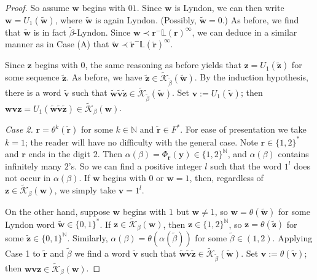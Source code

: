 \documentclass[11pt]{amsart}
\theoremstyle{definition}
\theoremstyle{remark}
\numberwithin{equation}{section}
\newcommand{\N}{\ensuremath{\mathbb{N}}}
\renewcommand{\L}{\ensuremath{\mathbb{L}}}
\newcommand{\Kt}{\widetilde{\mathcal{K}}}
\renewcommand{\r}{ {\mathbf{r}}}
\renewcommand{\v}{\mathbf{v}}
\newcommand{\w}{\mathbf{w}}
\newcommand{\y}{\mathbf{y}}
\newcommand{\z}{\mathbf{z}}
\newcommand{\f}{\infty}
\newcommand{\al}{\alpha}
\begin{document}
\begin{proof}
So assume $\w$ begins with $01$. Since $\w$ is Lyndon, we can then write $\w=U_1(\tilde{\w})$, where $\tilde{\w}$ is again Lyndon. (Possibly, $\tilde{\w}=0$.) As before, we find that $\tilde{\w}$ is in fact $\tilde{\beta}$-Lyndon.
Since $\w\prec \r^-\L(\r)^\f$, we can deduce in a similar manner as in Case (A) that $\tilde{\w}\prec \tilde{\r}^-\L(\tilde{\r})^\f$.

Since $\z$ begins with $0$, the same reasoning as before yields that $\z=U_1(\tilde{\z})$ for some sequence $\tilde{\z}$. As before, we have $\tilde{\z}\in\Kt_{\tilde\beta}(\tilde{\w})$. By the induction hypothesis, there is a word $\tilde{\v}$ such that $\tilde{\w}\tilde{\v}\tilde{\z}\in \Kt_{\tilde\beta}(\tilde{\w})$. Set $\v:=U_1(\tilde{\v})$; then $\w\v\z=U_1(\tilde{\w}\tilde{\v}\tilde{\z})\in \Kt_\beta(\w)$.

\medskip
{
{\em Case 2.} $\r=\theta^k(\tilde{\r})$ for some $k\in\N$ and $\tilde{\r}\in F^*$. For ease of presentation we take $k=1$; the reader will have no difficulty with the general case. Note $\r\in\{1,2\}^*$ and $\r$ ends in the digit $2$. Then $\al(\beta)=\Phi_\r(\y)\in\{1,2\}^\N$, and $\al(\beta)$ contains infinitely many $2$'s. So we can find a positive integer $l$ such that the word $1^l$ does not occur in $\al(\beta)$. If $\w$ begins with $0$ or $\w=1$, then, regardless of $\z\in\Kt_\beta(\w)$, we simply take $\v=1^l$. 

On the other hand, suppose $\w$ begins with $1$ but $\w\neq 1$, so $\w=\theta(\tilde{\w})$ for some Lyndon word $\tilde{\w}\in\{0,1\}^*$. If $\z\in\Kt_\beta(\w)$, then $\z\in\{1,2\}^\N$, so $\z=\theta(\tilde{\z})$ for some $\tilde{\z}\in\{0,1\}^\N$. Similarly, $\al(\beta)=\theta(\al(\tilde{\beta}))$ for some $\tilde{\beta}\in(1,2)$. Applying Case 1 to $\tilde{\r}$ and $\tilde{\beta}$ we find a word $\tilde{\v}$ such that $\tilde{\w}\tilde{\v}\tilde{\z}\in \Kt_{\tilde\beta}(\tilde{\w})$. Set $\v:=\theta(\tilde{\v})$; then $\w\v\z\in \Kt_\beta(\w)$.

}
\end{proof}
\end{document}
